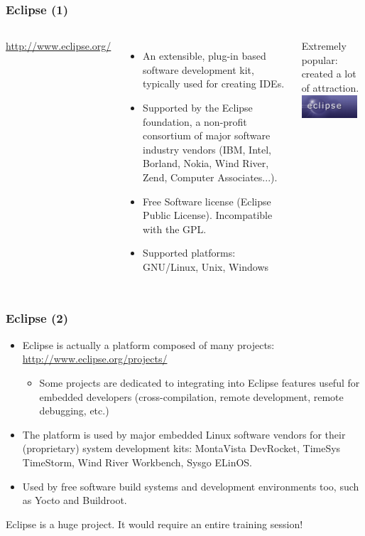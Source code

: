 \begin{frame}
  \frametitle{Eclipse (1)}
  \begin{columns}[T]
    \url{http://www.eclipse.org/}
    \begin{itemize}
    \item An extensible, plug-in based software development kit,
      typically used for creating IDEs.
    \item Supported by the Eclipse foundation, a non-profit consortium
      of major software industry vendors (IBM, Intel, Borland, Nokia,
      Wind River, Zend, Computer Associates...).
    \item Free Software license (Eclipse Public License). Incompatible
      with the GPL.
    \item Supported platforms: GNU/Linux, Unix, Windows
    \end{itemize}
    Extremely popular: created a lot of attraction.
    \includegraphics[width=0.9\textwidth]{slides/sysdev-application-development/eclipse.png}
  \end{columns}
\end{frame}

\begin{frame}
  \frametitle{Eclipse (2)}
  \begin{itemize}
  \item Eclipse is actually a platform composed of many projects:\\
    \url{http://www.eclipse.org/projects/}
    \begin{itemize}
    \item Some projects are dedicated to integrating into Eclipse
      features useful for embedded developers (cross-compilation,
      remote development, remote debugging, etc.)
    \end{itemize}
  \item The platform is used by major embedded Linux software vendors
    for their (proprietary) system development kits: MontaVista
    DevRocket, TimeSys TimeStorm, Wind River Workbench, Sysgo ELinOS.
  \item Used by free software build systems and development environments
    too, such as Yocto and Buildroot.
  \end{itemize}
  Eclipse is a huge project.  It would require an entire training
  session!
\end{frame}


